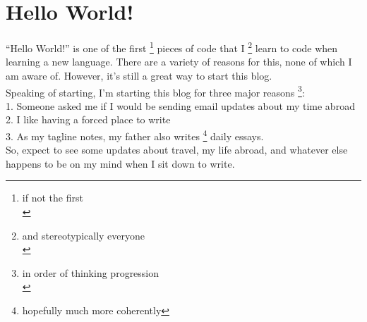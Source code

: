 \hypertarget{hello-world.html}{%
\section{Hello World!}\label{hello-world}}

``Hello World!'' is one of the first \footnote{if not the first\\}
pieces of code that I \footnote{and stereotypically everyone\\} learn to
code when learning a new language. There are a variety of reasons for
this, none of which I am aware of. However, it's still a great way to
start this blog.\\
Speaking of starting, I'm starting this blog for three major reasons
\footnote{in order of thinking progression\\}:\\
1. Someone asked me if I would be sending email updates about my time
abroad \\
2. I like having a forced place to write \\
3. As my tagline notes, my father also writes \footnote{hopefully much
  more coherently} daily essays. \\
So, expect to see some updates about travel, my life abroad, and
whatever else happens to be on my mind when I sit down to write.
